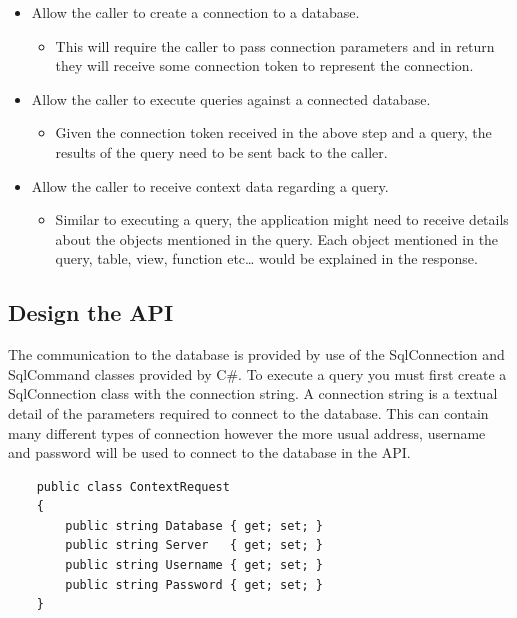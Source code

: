 \begin{itemize}
\tightlist
\item
  Allow the caller to create a connection to a database.

  \begin{itemize}
  \tightlist
  \item
    This will require the caller to pass connection parameters and in
    return they will receive some connection token to represent the
    connection.
  \end{itemize}
\item
  Allow the caller to execute queries against a connected database.

  \begin{itemize}
  \tightlist
  \item
    Given the connection token received in the above step and a query,
    the results of the query need to be sent back to the caller.
  \end{itemize}
\item
  Allow the caller to receive context data regarding a query.

  \begin{itemize}
  \tightlist
  \item
    Similar to executing a query, the application might need to receive
    details about the objects mentioned in the query. Each object
    mentioned in the query, table, view, function etc\ldots{} would be
    explained in the response.
  \end{itemize}
\end{itemize}

\subsection{Design the API}\label{design-the-api}

The communication to the database is provided by use of the
SqlConnection and SqlCommand classes provided by C\#. To execute a query
you must first create a SqlConnection class with the connection string.
A connection string is a textual detail of the parameters required to
connect to the database. This can contain many different types of
connection however the more usual address,  username and password will
be used to connect to the database in the API.
\begin{listing}[ht]
\begin{verbatim}
    public class ContextRequest
    {
        public string Database { get; set; }
        public string Server   { get; set; }
        public string Username { get; set; }
        public string Password { get; set; }
    }
\end{verbatim}
\end{listing}

